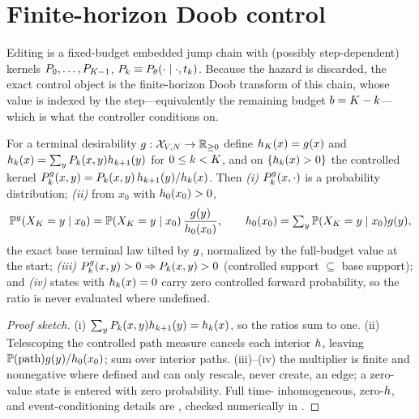 \section{Finite-horizon Doob control}
\label{sec:doob}

Editing is a fixed-budget embedded jump chain with (possibly step-dependent) kernels
$P_0,\dots,P_{K-1}$, $P_k\equiv P_\theta(\cdot\mid\cdot,t_k)$. Because the
hazard is discarded, the exact control object is the finite-horizon Doob transform of this chain, whose
value is indexed by the step---equivalently the remaining budget $b=K-k$---which is what the
controller conditions on.

\begin{theorem}
\label{thm:doob}
For a terminal desirability $g:\mathcal{X}_{V,N}\to\mathbb{R}_{\ge0}$ define
$h_{K}(x)=g(x)$ and $h_k(x)=\sum_yP_k(x,y)h_{k+1}(y)$ for $0\le k<K$,
and on $\{h_k(x)>0\}$ the controlled kernel
$P^{g}_k(x,y)=P_k(x,y)\,h_{k+1}(y)/h_k(x)$.
Then \emph{(i)} $P^{g}_k(x,\cdot)$ is a probability distribution; \emph{(ii)} from $x_0$ with
$h_0(x_0)>0$,
\begin{equation}
\mathbb{P}^{g}(X_{K}=y\mid x_0)=\mathbb{P}(X_{K}=y\mid x_0)\,\frac{g(y)}{h_0(x_0)},\qquad
h_0(x_0)=\textstyle\sum_y\mathbb{P}(X_{K}=y\mid x_0)g(y),
\label{eq:terminaltilt}
\end{equation}
the exact base terminal law tilted by $g$, normalized by the full-budget value at the start;
\emph{(iii)} $P^{g}_k(x,y)>0\Rightarrow P_k(x,y)>0$ (controlled support $\subseteq$ base
support); and \emph{(iv)} states with $h_k(x)=0$ carry zero controlled forward probability, so the
ratio is never evaluated where undefined.
\end{theorem}
\begin{proof}[Proof sketch]
(i) $\sum_yP_k(x,y)h_{k+1}(y)=h_k(x)$, so the ratios sum to one. (ii) Telescoping the
controlled path measure cancels each interior $h$, leaving $\mathbb{P}(\text{path})g(y)/h_0(x_0)$;
sum over interior paths. (iii)--(iv) the multiplier is finite and nonnegative where defined and can only
rescale, never create, an edge; a zero-value state is entered with zero probability. Full time-%
inhomogeneous, zero-$h$, and event-conditioning details are , checked numerically in
.
\end{proof}

